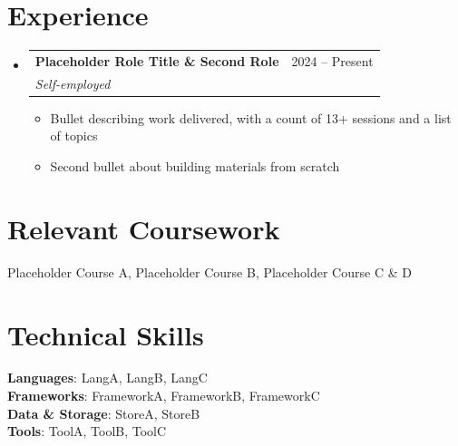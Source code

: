 \documentclass[letterpaper,11pt]{article}
\makeatletter
\newcommand{\resumeItem}[1]{
  \item\small{
    {#1 \vspace{-2pt}}
  }
}
\newcommand{\resumeSubheading}[4]{
  \vspace{-2pt}\item
    \begin{tabular*}{0.97\textwidth}[t]{l@{\extracolsep{\fill}}r}
      \textbf{#1} & #2 \\
      \textit{\small#3} & \textit{\small #4} \\
    \end{tabular*}\vspace{-7pt}
}
\newcommand{\resumeSubHeadingListStart}{\begin{itemize}[leftmargin=0.15in, label={}]}
\newcommand{\resumeSubHeadingListEnd}{\end{itemize}}
\newcommand{\resumeItemListStart}{\begin{itemize}}
\newcommand{\resumeItemListEnd}{\end{itemize}\vspace{-5pt}}
\makeatother
\begin{document}
\section{Experience}
\resumeSubHeadingListStart
 
  \resumeSubheading
    {Placeholder Role Title \& Second Role}{2024 -- Present}
    {Self-employed}{}
    \resumeItemListStart
      \resumeItem{Bullet describing work delivered, with a count of 13+ sessions and a list of topics}
      \resumeItem{Second bullet about building materials from scratch}
    \resumeItemListEnd
 
\resumeSubHeadingListEnd
    
\section{Relevant Coursework}
 \small{Placeholder Course A, Placeholder Course B, Placeholder Course C \& D}

\section{Technical Skills}
\begin{itemize}[leftmargin=0.15in, label={}, topsep=0pt, parsep=0pt]
  \small{\item{
    \textbf{Languages}{: LangA, LangB, LangC} \\
    \textbf{Frameworks}{: FrameworkA, FrameworkB, FrameworkC} \\
    \textbf{Data \& Storage}{: StoreA, StoreB} \\
    \textbf{Tools}{: ToolA, ToolB, ToolC} \\
  }}
\end{itemize}
\end{document}
